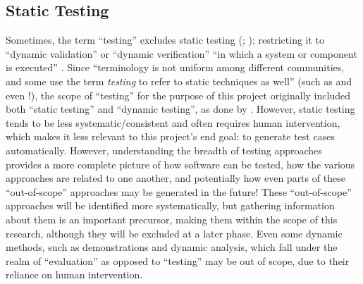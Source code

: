 \subsection{Static Testing}
\label{static-test}
Sometimes, the term ``testing'' excludes static testing
(\citealp[p.~222]{AmmannAndOffutt2017}; \citealp[p.~13]{Firesmith2015});
restricting it to ``dynamic validation'' \citep[p.~5-1]{SWEBOK2024} or
``dynamic verification'' ``in which a system or component is
executed'' \citep[p.~427]{IEEE2017}. Since ``terminology is not uniform
among different communities, and some use the term \emph{testing} to refer to
static techniques as well''
\citep[p.~5-2]{SWEBOK2024} (such as \citep[pp.~8-9]{Gerrard2000a} and even
\citep[p.~440]{IEEE2017}!), the scope of ``testing'' for the purpose of this
project originally included both ``static testing'' and ``dynamic testing'', as
done by \citet[p.~17]{IEEE2022}. However, static testing tends to be less
systematic/consistent and often requires human intervention, which makes it
less relevant to this project's end goal: to generate test cases automatically.
However, understanding the breadth of testing approaches provides a more
complete picture of how software can be tested, how the various approaches are
related to one another, and potentially how even parts of these ``out-of-scope''
approaches may be generated in the future! These ``out-of-scope'' approaches
will be identified more systematically, but gathering information about them is
an important precursor, making them within the scope of this research, although
they will be excluded at a later phase. Even some dynamic methods, such as
demonstrations and dynamic analysis, which fall under the realm of ``evaluation''
as opposed to ``testing'' \citep[p.~13]{Firesmith2015} may be out of scope, due
to their reliance on human intervention.